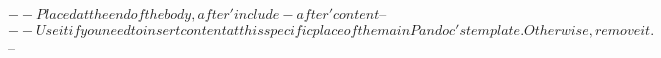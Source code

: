 $-- Placed at the end of the body, after 'include-after' content
$-- %
$-- Use it if you need to insert content at this specific place of the main Pandoc's template. Otherwise, remove it.
$-- %

\listoftables
\listoffigures
